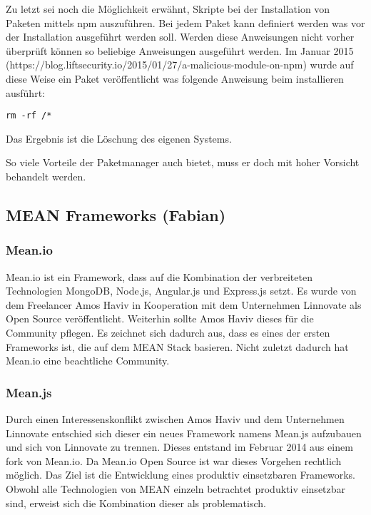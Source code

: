\documentclass[]{article}
\begin{document}
Zu letzt sei noch die Möglichkeit erwähnt, Skripte bei der Installation
von Paketen mittels npm auszuführen. Bei jedem Paket kann definiert
werden was vor der Installation ausgeführt werden soll. Werden diese
Anweisungen nicht vorher überprüft können so beliebige Anweisungen
ausgeführt werden. Im Januar 2015
(https://blog.liftsecurity.io/2015/01/27/a-malicious-module-on-npm)
wurde auf diese Weise ein Paket veröffentlicht was folgende Anweisung
beim installieren ausführt:

\begin{verbatim}
rm -rf /*
\end{verbatim}

Das Ergebnis ist die Löschung des eigenen Systems.

So viele Vorteile der Paketmanager auch bietet, muss er doch mit hoher
Vorsicht behandelt werden.

\subsection{MEAN Frameworks (Fabian)}\label{mean-frameworks-fabian}

\subsubsection{Mean.io}\label{mean.io}

Mean.io ist ein Framework, dass auf die Kombination der verbreiteten
Technologien MongoDB, Node.js, Angular.js und Express.js setzt. Es wurde
von dem Freelancer Amos Haviv in Kooperation mit dem Unternehmen
Linnovate als Open Source veröffentlicht. Weiterhin sollte Amos Haviv
dieses für die Community pflegen. Es zeichnet sich dadurch aus, dass es
eines der ersten Frameworks ist, die auf dem MEAN Stack basieren. Nicht
zuletzt dadurch hat Mean.io eine beachtliche Community.

\subsubsection{Mean.js}\label{mean.js}

Durch einen Interessenskonflikt zwischen Amos Haviv und dem Unternehmen
Linnovate entschied sich dieser ein neues Framework namens Mean.js
aufzubauen und sich von Linnovate zu trennen. Dieses entstand im Februar
2014 aus einem fork von Mean.io. Da Mean.io Open Source ist war dieses
Vorgehen rechtlich möglich. Das Ziel ist die Entwicklung eines produktiv
einsetzbaren Frameworks. Obwohl alle Technologien von MEAN einzeln
betrachtet produktiv einsetzbar sind, erweist sich die Kombination
dieser als problematisch.
\end{document}
